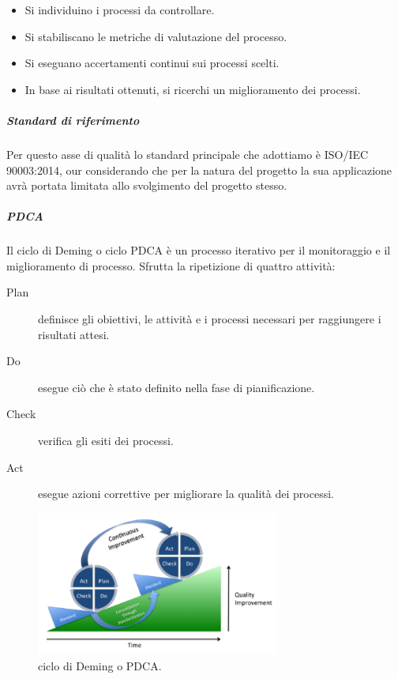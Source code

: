 \documentclass[../../norme-di-progetto.tex]{subfiles}
\begin{document}
\begin{itemize}
  \item Si individuino i processi da controllare.
  \item Si stabiliscano le metriche di valutazione del processo.
  \item Si eseguano accertamenti continui sui processi scelti.
  \item In base ai risultati ottenuti, si ricerchi un miglioramento dei processi.
\end{itemize}

\subparagraph{Standard di riferimento}%
\label{subp:accertamento_qualita_di_processo/standard_di_riferimento}

Per questo asse di qualità lo standard principale che adottiamo è ISO/IEC 90003:2014, our considerando che per la natura del progetto la sua applicazione avrà portata limitata allo svolgimento del progetto stesso.

\subparagraph{PDCA}%
\label{subp:PDCA}
Il ciclo di Deming o ciclo PDCA è un processo iterativo per il monitoraggio e il miglioramento di processo. Sfrutta la ripetizione di quattro attività:

\begin{description}
  \item [Plan] definisce gli obiettivi, le attività e i processi necessari per raggiungere i risultati attesi.
  \item [Do] esegue ciò che è stato definito nella fase di pianificazione.
  \item [Check] verifica gli esiti dei processi.
  \item [Act] esegue azioni correttive per migliorare la qualità dei processi.
\end{description}
\begin{figure}[H]
  \includegraphics[width=8cm]{PDCA-process.png}
  \centering
  \caption{ciclo di Deming o PDCA.}
\end{figure}
\end{document}
